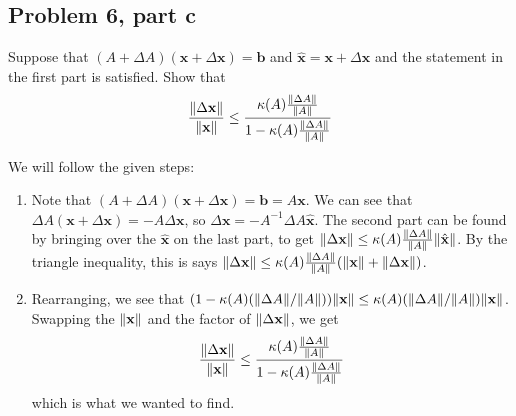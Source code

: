 \subsection{Problem 6, part c}
Suppose that $(A + \Delta A) (\textbf{x} + \Delta \textbf{x}) = \textbf{b}$ and $\hat{\textbf{x}} = \textbf{x} + \Delta \textbf{x}$ and the statement in the first part is satisfied. Show that 
\[
\frac{\norm{\Delta \textbf{x}}}{\norm{\textbf{x}}} \leq \frac{\kappa(A)\frac{\norm{\Delta A}}{\norm{A}}}{1 - \kappa(A)\frac{\norm{\Delta A}}{\norm{A}}}
\]
\partbreak
\begin{solution}
    
We will follow the given steps:
\begin{enumerate}
    \item Note that $(A + \Delta A) (\textbf{x} + \Delta \textbf{x}) = \textbf{b} = A\textbf{x}$. We can see that $\Delta A (\textbf{x} + \Delta \textbf{x}) = -A \Delta \textbf{x}$, so $\Delta \textbf{x} = -A^{-1}\Delta A \hat{\textbf{x}}$. The second part can be found by bringing over the $\hat{\textbf{x}}$ on the last part, to get $\norm{\Delta \textbf{x}} \leq \kappa(A) \frac{\norm{\Delta A}}{\norm{A}} \norm{\hat{\textbf{x}}}$. By the triangle inequality, this is says $\norm{\Delta \textbf{x}} \leq \kappa(A) \frac{\norm{\Delta A}}{\norm{A}} (\norm{\textbf{x}} + \norm{\Delta\textbf{x}})$.
    \item Rearranging, we see that $( 1 - \kappa(A)(\norm{\Delta A} / \norm{A}))\norm{\textbf{x}} \leq \kappa(A)(\norm{\Delta A} / \norm{A})\norm{\textbf{x}}$. Swapping the $\norm{\textbf{x}}$ and the factor of $\norm{\Delta \textbf{x}}$, we get
    \[
    \frac{\norm{\Delta \textbf{x}}}{\norm{\textbf{x}}} \leq \frac{\kappa(A)\frac{\norm{\Delta A}}{\norm{A}}}{1 - \kappa(A)\frac{\norm{\Delta A}}{\norm{A}}}
    \]
    which is what we wanted to find.
\end{enumerate}

\end{solution}

\newpage
